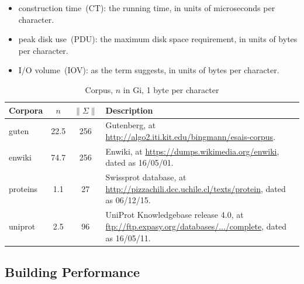 \documentclass[10pt,journal,compsoc]{IEEEtran}
\begin{document}
\begin{itemize}
	\item construction time~(CT): the running time, in units of microseconds per character.
	\item peak disk use~(PDU): the maximum disk space requirement, in units of bytes per character.
	\item I/O volume~(IOV): as the term suggests, in units of bytes per character.
\end{itemize}

\renewcommand\arraystretch{1.3}
\begin{table}[!h]
	\caption{Corpus, $n$ in Gi, 1 byte per character}
	\label{tbl:corpora}
	\centering
	\begin{tabular}{|l|c|c|p{5cm}|}
		\hline
		Corpora & \multicolumn{1}{c|}{$n$} & \multicolumn{1}{c|}{$\|\Sigma\|$} & Description \\\hline
		guten & 22.5 & 256 & Gutenberg, at \url{http://algo2.iti.kit.edu/bingmann/esais-corpus}.\\\hline 				
		enwiki & 74.7 & 256 & Enwiki, at \url{https://dumps.wikimedia.org/enwiki}, dated as 16/05/01. \\\hline	
		proteins & 1.1 & 27 & Swissprot database, at \url{http://pizzachili.dcc.uchile.cl/texts/protein}, dated as 06/12/15. \\\hline
		uniprot & 2.5 & 96 & UniProt Knowledgebase release 4.0, at \url{ftp://ftp.expasy.org/databases/.../complete}, dated as 16/05/11. \\\hline
	\end{tabular}
\end{table}

\subsection{Building Performance}
\end{document}
